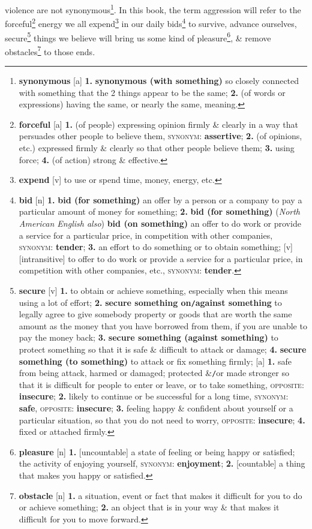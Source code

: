 \documentclass[oneside]{book}
\numberwithin{equation}{section}
\begin{document}
violence are not synonymous\footnote{\textbf{synonymous} [a] \textbf{1.} \textbf{synonymous (with something)} so closely connected with something that the 2 things appear to be the same; \textbf{2.} (of words or expressions) having the same, or nearly the same, meaning.}. In this book, the term aggression will refer to the forceful\footnote{\textbf{forceful} [a] \textbf{1.} (of people) expressing opinion firmly \& clearly in a way that persuades other people to believe them, \textsc{synonym}: \textbf{assertive}; \textbf{2.} (of opinions, etc.) expressed firmly \& clearly so that other people believe them; \textbf{3.} using force; \textbf{4.} (of action) strong \& effective.} energy we all expend\footnote{\textbf{expend} [v] to use or spend time, money, energy, etc.} in our daily bids\footnote{\textbf{bid} [n] \textbf{1.} \textbf{bid (for something)} an offer by a person or a company to pay a particular amount of money for something; \textbf{2.} \textbf{bid (for something)} (\textit{North American English also}) \textbf{bid (on something)} an offer to do work or provide a service for a particular price, in competition with other companies, \textsc{synonym}: \textbf{tender}; \textbf{3.} an effort to do something or to obtain something; [v] [intransitive] to offer to do work or provide a service for a particular price, in competition with other companies, etc., \textsc{synonym}: \textbf{tender}.} to survive, advance ourselves, secure\footnote{\textbf{secure} [v] \textbf{1.} to obtain or achieve something, especially when this means using a lot of effort; \textbf{2.} \textbf{secure something on\texttt{/}against something} to legally agree to give somebody property or goods that are worth the same amount as the money that you have borrowed from them, if you are unable to pay the money back; \textbf{3.} \textbf{secure something (against something)} to protect something so that it is safe \& difficult to attack or damage; \textbf{4.} \textbf{secure something (to something)} to attack or fix something firmly; [a] \textbf{1.} safe from being attack, harmed or damaged; protected \&\texttt{/}or made stronger so that it is difficult for people to enter or leave, or to take something, \textsc{opposite}: \textbf{insecure}; \textbf{2.} likely to continue or be successful for a long time, \textsc{synonym}: \textbf{safe}, \textsc{opposite}: \textbf{insecure}; \textbf{3.} feeling happy \& confident about yourself or a particular situation, so that you do not need to worry, \textsc{opposite}: \textbf{insecure}; \textbf{4.} fixed or attached firmly.} things we believe will bring us some kind of pleasure\footnote{\textbf{pleasure} [n] \textbf{1.} [uncountable] a state of feeling or being happy or satisfied; the activity of enjoying yourself, \textsc{synonym}: \textbf{enjoyment}; \textbf{2.} [countable] a thing that makes you happy or satisfied.}, \& remove obstacles\footnote{\textbf{obstacle} [n] \textbf{1.} a situation, event or fact that makes it difficult for you to do or achieve something; \textbf{2.} an object that is in your way \& that makes it difficult for you to move forward.} to those ends.
\end{document}
